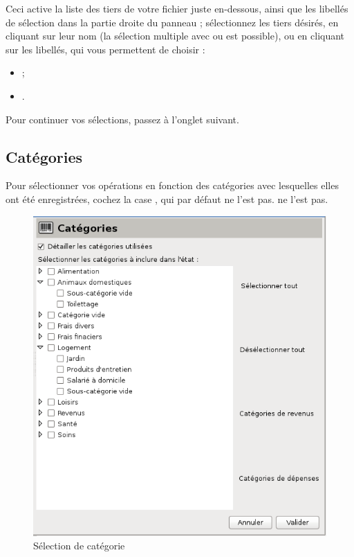 Ceci active la liste des tiers de votre fichier juste en-dessous, ainsi que les libellés de sélection dans la partie droite du panneau ; sélectionnez les tiers désirés, en cliquant sur leur nom (la sélection multiple avec  ou   est possible), ou en cliquant sur les libellés, qui vous permettent de choisir :

\begin{itemize}
	  \item {} ;
	  \item {}.
\end{itemize}

Pour continuer vos sélections, passez à l'onglet suivant.


\subsection{Catégories\label{reportscreation-selection-categories}}

Pour sélectionner vos opérations en fonction des catégories avec lesquelles elles ont été enregistrées, cochez la case , qui par défaut \ifIllustration ne l'est pas.
\else ne l'est pas.
\fi

\ifIllustration
\begin{figure}[htbp]
\begin{center}
\includegraphics[scale=0.5]{image/screenshot/reportcreation_datas_categories}
\end{center}
\caption{Sélection de catégorie}
\label{reportcreation-datas-categories-img}
\end{figure}
\fi

